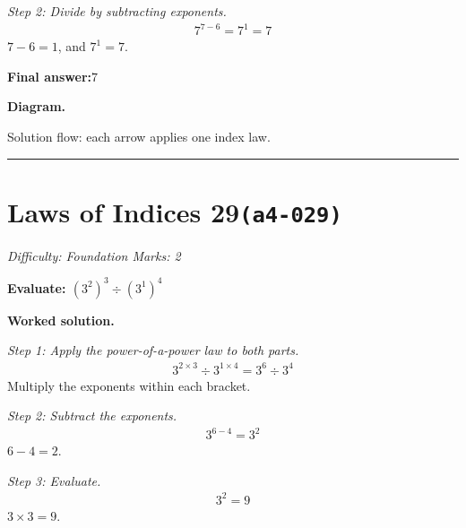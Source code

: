 \documentclass[11pt]{article}
\newcommand{\question}[1]{\par\medskip\noindent\textbf{#1}\par}
\begin{document}
\textit{Step 2: Divide by subtracting exponents.}
\[\begin{gathered}
7^{7-6} = 7^1 = 7
\end{gathered}\]
\( 7 - 6 = 1 \), and \( 7^1 = 7 \).

\begin{answerbox}
\textbf{Final answer:}\quad \(\displaystyle 7\)
\end{answerbox}
\textbf{Diagram.}

\begin{center}
\end{center}
\small Solution flow: each arrow applies one index law.\normalsize

\medskip\hrule

\section*{Laws of Indices 29\quad\small\texttt{(a4-029)}}
\textit{Difficulty: Foundation \quad\textbar\quad Marks: 2}

\question{Evaluate: \( (3^2)^3 \div (3^1)^4 \)}

\textbf{Worked solution.}

\textit{Step 1: Apply the power-of-a-power law to both parts.}
\[\begin{gathered}
3^{2 \times 3} \div 3^{1 \times 4} = 3^6 \div 3^4
\end{gathered}\]
Multiply the exponents within each bracket.

\textit{Step 2: Subtract the exponents.}
\[\begin{gathered}
3^{6-4} = 3^2
\end{gathered}\]
\( 6 - 4 = 2 \).

\textit{Step 3: Evaluate.}
\[\begin{gathered}
3^2 = 9
\end{gathered}\]
\( 3 \times 3 = 9 \).
\end{document}
